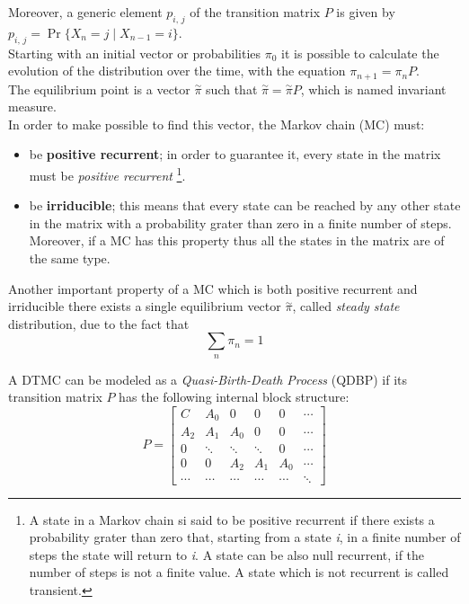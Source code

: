 Moreover, a generic element \(p_{i,\,j}\) of the transition matrix \( P \) is given by \( p_{i,\,j} = \Pr\{X_{n} = j \mid X_{n-1} = i\} \).\\
Starting with an initial vector or probabilities \( \pi_{0} \) it is possible to calculate the evolution of the distribution over the time, with the equation \( \pi_{n+1} = \pi_{n}P \).\\
The equilibrium point is a vector \( \overset{\sim}{\pi} \) such that \( \overset{\sim}{\pi} = \overset{\sim}{\pi}P \), which is named invariant measure.\\
In order to make possible to find this vector, the Markov chain (MC) must:
\begin{itemize}
  \item be \textbf{positive recurrent}; in order to guarantee it, every state in the matrix must be \emph{positive recurrent} \footnote{A state in a Markov chain si said to be positive recurrent if there exists a probability grater than zero that, starting from a state \emph{i}, in a finite number of steps the state will return to \emph{i}. A state can be also null recurrent, if the number of steps is not a finite value. A state which is not recurrent is called transient.}. 
  \item be \textbf{irriducible}; this means that every state can be reached by any other state in the matrix with a probability grater than zero in a finite number of steps. Moreover, if a MC has this property thus all the states in the matrix are of the same type.  
\end{itemize}

Another important property of a MC which is both positive recurrent and irriducible there exists a single equilibrium vector \( \overset{\sim}{\pi} \), called \emph{steady state} distribution, due to the fact that
\begin{equation*}
  \displaystyle\sum_{n} \pi_{n} = 1
\end{equation*}

A DTMC can be modeled as a \emph{Quasi-Birth-Death Process} (QDBP) if its transition matrix \( P \) has the following internal block structure:
\begin{equation*}
  P = 
  \begin{bmatrix}
    C & A_{0} & 0 & 0 & 0 & \cdots \\
    A_{2} & A_{1} & A_{0} & 0 & 0 & \cdots \\
    0 & \ddots & \ddots & \ddots & 0 & \cdots \\
    0 & 0 & A_{2} & A_{1} & A_{0} & \cdots \\
    \cdots & \cdots & \cdots & \cdots & \cdots & \ddots
  \end{bmatrix}
\end{equation*}

